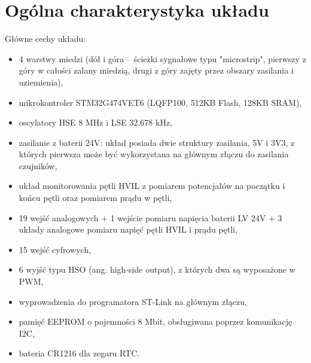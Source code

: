 \chapter{Ogólna charakterystyka układu}\label{chap:glowne_cechy}
Główne cechy układu:
\begin{itemize}
	\item 4 warstwy miedzi (dół i góra -- ścieżki sygnałowe typu "microstrip", pierwszy z góry w całości zalany miedzią, drugi z góry zajęty przez obszary zasilania i uziemienia),
	\item mikrokontroler STM32G474VET6 (LQFP100, 512KB Flash, 128KB SRAM),
	\item oscylatory HSE 8 MHz i LSE 32.678 kHz,
	\item zasilanie z baterii 24V: układ posiada dwie struktury zasilania, 5V i 3V3, z których pierwsza może być wykorzystana na głównym złączu do zasilania czujników,
	\item układ monitorowania pętli HVIL z pomiarem potencjałów na początku i końcu pętli oraz pomiarem prądu w pętli,
	\item 19 wejść analogowych + 1 wejście pomiaru napięcia baterii LV 24V + 3 układy analogowe pomiaru napięć pętli HVIL i prądu pętli,
	\item 15 wejść cyfrowych,
	\item 6 wyjść typu HSO (ang. high-side output), z których dwa są wyposażone w PWM,
	\item wyprowadzenia do programatora ST-Link na głównym złączu,
	\item pamięć EEPROM o pojemności 8 Mbit, obsługiwana poprzez komunikację I2C,
	\item bateria CR1216 dla zegaru RTC.
\end{itemize}

